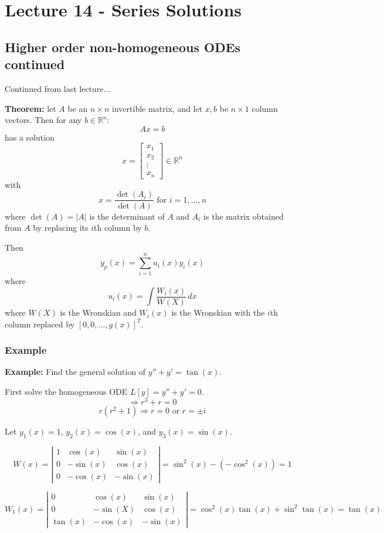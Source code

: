 \documentclass[11pt]{article}
\newcommand{\example}{\textbf{Example: }}
\newcommand{\sumser}{\sum_{i=1}^n}
\begin{document}
\section{Lecture 14 - Series Solutions}
\subsection{Higher order non-homogeneous ODEs continued}
	Continued from last lecture...

	\textbf{Theorem:} let $A$ be an $n \times n$ invertible matrix, and let $x,b$ be $n \times 1$ column vectors. Then for any $b \in \mathbb{R}^n$:
		$$ A x = b $$
	has a solution
		$$ x =
			\left[
			\begin{array}{c}
				x_1 \\
				x_2 \\
				\vdots \\
				x_n
			\end{array}
			\right] \in \mathbb{R}^n
		$$
	with
		$$ x = \frac{\det (A_i)}{\det (A)} \text{ for } i = 1,\ldots, n $$
	where $\det(A) = |A|$ is the determinant of $A$ and $A_i$ is the matrix obtained from $A$ by replacing its $i$th column by $b$.

	Then
		$$ y_p(x) = \sumser u_i (x) y_i (x) $$
	where
		$$ u_i (x) = \int \frac{W_i (x)}{W(X)} \,dx $$
	where $W(X)$ is the Wronskian and $W_i (x)$ is the Wronskian with the $i$th column replaced by $[0, 0, \ldots, g(x)]^T$.

\subsubsection{Example}
	\example Find the general solution of $y'' + y' = \tan(x)$.

	First solve the homogeneous ODE $L[y]=y'' + y' = 0$.
		$$ \Rightarrow r^3 + r = 0 $$
		$$ r(r^2 + 1) \Rightarrow r = 0 \text{ or } r = \pm i $$

	Let $y_1 (x) = 1$, $y_2 (x) = \cos(x)$, and $y_3 (x) = \sin (x)$.

		$$ W(x) =
			\left|
				\begin{array}{ccc}
					1 & \cos(x) & \sin(x) \\
					0 & - \sin(x) & \cos(x) \\
					0 & - \cos(x) & - \sin(x)
				\end{array}
			\right|
			= \sin^2 (x) - (- \cos^2 (x)) = 1
		$$

		$$ W_1 (x) =
			\left|
				\begin{array}{ccc}
					0 & \cos(x) & \sin(x) \\
					0 & -\sin(X) & \cos(x) \\
					\tan(x) & - \cos(x) & - \sin(x)
				\end{array}
			\right|
			= \cos^2 (x) \tan (x) + \sin^2 \tan(x) = \tan(x)
		$$
\end{document}
